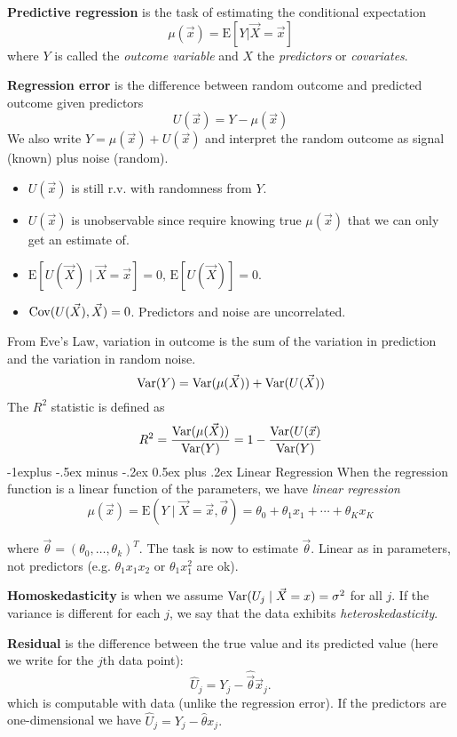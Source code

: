 \documentclass[10pt,landscape]{article}
\makeatletter
\renewcommand{\subsection}{\@startsection{subsection}{2}{0mm}%
                                {-1explus -.5ex minus -.2ex}%
                                {0.5ex plus .2ex}%
                                {\normalfont\normalsize\bfseries}}
\newcommand{\E}{\text{E}}
\makeatother
\begin{document}
\begin{multicols*}{3}
\textbf{Predictive regression} is the task of estimating the conditional expectation
$$
\mu(\vec{x})=\E[Y|\vec{X}=\vec{x}]
$$
where $Y$ is called the \emph{outcome variable} and $X$ the \emph{predictors} or \emph{covariates}.

\textbf{Regression error} is the difference between random outcome and predicted outcome given predictors
$$
U(\vec{x})=Y-\mu(\vec{x})
$$
We also write $Y=\mu(\vec{x})+U(\vec{x})$ and interpret the random outcome as signal (known) plus noise (random).
\begin{itemize}
    \item $U(\vec{x})$ is still r.v. with randomness from $Y$.
    \item $U(\vec{x})$ is unobservable since require knowing true $\mu(\vec{x})$ that we can only get an estimate of.
    \item $\E[U(\vec{X})\mid\vec{X}=\vec{x}]=0,\,\E[U(\vec{X})]=0$.
    \item $\operatorname{Cov}(U(\vec{X}),\vec{X})=0$. Predictors and noise are uncorrelated.
\end{itemize}
From Eve's Law, variation in outcome is the sum of the variation in prediction and the variation in random noise.
$$
\operatorname{Var}(Y)=\operatorname{Var}(\mu(\vec{X}))+\operatorname{Var}(U(\vec{X}))
$$
The $R^2$ statistic is defined as
$$
R^2=\frac{\operatorname{Var}(\mu(\vec{X}))}{\operatorname{Var}(Y)}=1-\frac{\operatorname{Var}(U(\vec{x})}{\operatorname{Var}(Y)}
$$
\subsection{Linear Regression}
When the regression function is a linear function of the parameters, we have \emph{linear regression}
$$\mu(\vec{x})=\E (Y\mid \vec{X}=\vec{x},\vec{\theta})=\theta_0+\theta_1x_1+\cdots+\theta_K x_K$$

where $\vec{\theta}=(\theta_0,\ldots,\theta_k)^T$. The task is now to estimate $\vec{\theta}$. Linear as in parameters, not predictors (e.g. $\theta_1 x_1 x_2$ or $\theta_1 x_1^2$ are ok).

\textbf{Homoskedasticity} is when we assume $\operatorname{Var} (U_j\mid \vec{X}={x})=\sigma^2$ for all $j$. If the variance is different for each $j$, we say that the data exhibits \emph{heteroskedasticity}.

\textbf{Residual} is the difference between the true value and its predicted value (here we write for the $j$th data point):
$$\hat{U}_j=Y_j-\hat{\vec\theta}\vec x_j.$$
which is computable with data (unlike the regression error). If the predictors are one-dimensional we have $\hat{U}_j=Y_j-\hat{\theta} x_j.$


\end{multicols*}
\end{document}
